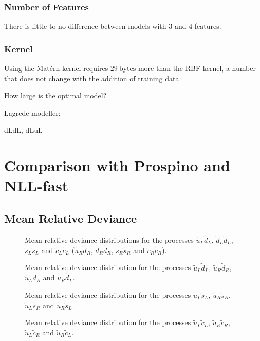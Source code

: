 \documentclass[twoside,english]{uiofysmaster}
\begin{document}
\subsubsection{Number of Features}
There is little to no difference between models with 3 and 4 features.
\subsubsection{Kernel}
Using the Mat\'{e}rn kernel requires $29~\text{bytes}$ more than the RBF kernel, a number that does not change with the addition of training data.

How large is the optimal model?


Lagrede modeller:

dLdL, dLuL

\section{Comparison with Prospino and NLL-fast}

\subsection{Mean Relative Deviance}

\begin{figure}
\caption{Mean relative deviance distributions for the processes $\tilde{u}_L \tilde{d}_L$, $\tilde{d}_L \tilde{d}_L$, $\tilde{s}_L \tilde{s}_L$ and $\tilde{c}_L \tilde{c}_L$ ($\tilde{u}_R \tilde{d}_R$, $\tilde{d}_R \tilde{d}_R$, $\tilde{s}_R \tilde{s}_R$ and $\tilde{c}_R \tilde{c}_R$).}
\end{figure}

\begin{figure}
\caption{Mean relative deviance distribution for the processes $\tilde{u}_L\tilde{d}_L$, $\tilde{u}_R\tilde{d}_R$, $\tilde{u}_L\tilde{d}_R$ and $\tilde{u}_R\tilde{d}_L$.}
\end{figure}

\begin{figure}
\caption{Mean relative deviance distribution for the processes $\tilde{u}_L\tilde{s}_L$, $\tilde{u}_R\tilde{s}_R$, $\tilde{u}_L\tilde{s}_R$ and $\tilde{u}_R\tilde{s}_L$.}
\end{figure}

\begin{figure}
\caption{Mean relative deviance distribution for the processes $\tilde{u}_L\tilde{c}_L$, $\tilde{u}_R\tilde{c}_R$, $\tilde{u}_L\tilde{c}_R$ and $\tilde{u}_R\tilde{c}_L$.}
\end{figure}
\end{document}

